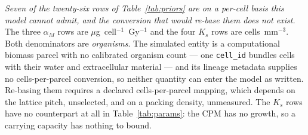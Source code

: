 \documentclass[11pt]{article}
\begin{document}
\emph{Seven of the twenty-six rows of Table~\ref{tab:priors} are on a per-cell basis this model cannot
admit, and the conversion that would re-base them does not exist.} The three $\alpha_M$ rows are
$\mu$g~cell$^{-1}$~Gy$^{-1}$ and the four $K_s$ rows are cells~mm$^{-3}$. Both denominators are
\emph{organisms}. The simulated entity is a computational biomass parcel with no calibrated organism
count --- one \texttt{cell\_id} bundles cells with their water and extracellular material --- and its
lineage metadata supplies no cells-per-parcel conversion, so neither quantity can enter the model as
written. Re-basing them requires a declared cells-per-parcel mapping, which depends on the lattice
pitch, unselected, and on a packing density, unmeasured. The $K_s$ rows have no counterpart at all in
Table~\ref{tab:params}: the CPM has no growth, so a carrying capacity has nothing to bound.
\end{document}
